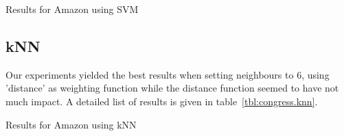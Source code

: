 \begin{table}[hbt]
\centering

\caption{Results for Amazon using SVM}
\label{tbl:amazon.svm}
\end{table}


\subsection{kNN}
Our experiments yielded the best results when setting neighbours to $6$, using 'distance' as weighting function while the distance function seemed to have not much impact. 
A detailed list of results is given in table~\ref{tbl:congress.knn}. 
\begin{table}[htb]
\centering

\caption{Results for Amazon using kNN}
\label{tbl:amazon.knn}
\end{table}
